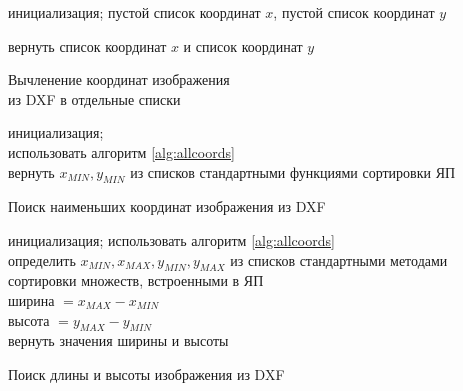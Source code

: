 \begin{algorithm}[H]
	\SetAlgoLined
	инициализация; пустой список координат $x$, пустой список координат $y$
	
	
	
	
	вернуть список координат $x$ и список координат $y$
	\caption[Вычленение координат изображения; из DXF в отдельные списки]
	{Вычленение координат изображения \\ из DXF в отдельные списки\endtabular}
	\label{alg:allcoords}
\end{algorithm}

\begin{algorithm}[H]
	\SetAlgoLined
	инициализация;\\
	использовать алгоритм \ref{alg:allcoords}\\
	вернуть $x_{MIN}, y_{MIN}$ из списков стандартными функциями сортировки ЯП
	\caption{Поиск наименьших координат изображения из DXF}
	\label{alg:extremums}
\end{algorithm}
\hfill \break

\begin{algorithm}[H]
	\SetAlgoLined
	инициализация;
	использовать алгоритм \ref{alg:allcoords}\\
	определить $x_{MIN}, x_{MAX}, y_{MIN}, y_{MAX}$ из списков стандартными методами сортировки множеств, встроенными в ЯП\\
	ширина $=x_{MAX}-x_{MIN}$\\
	высота $=y_{MAX}-y_{MIN}$\\
	вернуть значения ширины и высоты
	\caption{Поиск длины и высоты изображения из DXF}
	\label{alg:dimes}
\end{algorithm}


